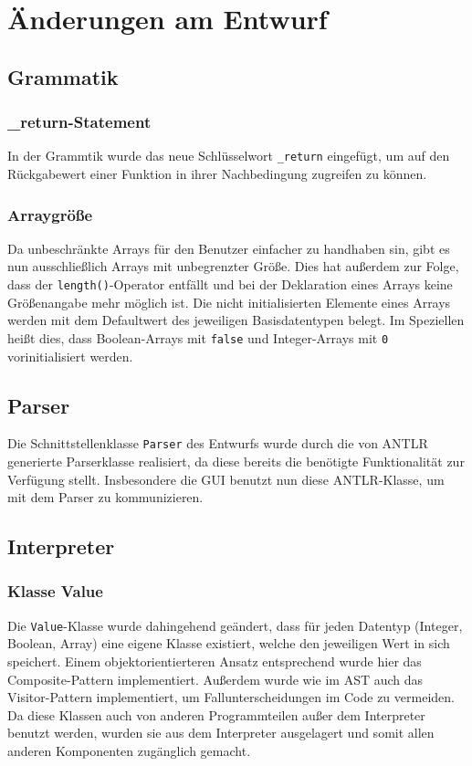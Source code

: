 \section{Änderungen am Entwurf}
\subsection{Grammatik}
\subsubsection{\_return-Statement}
In der Grammtik wurde das neue Schlüsselwort \texttt{\_return} eingefügt, um auf den Rückgabewert einer Funktion in ihrer Nachbedingung zugreifen zu können.
\subsubsection{Arraygröße}
Da unbeschränkte Arrays für den Benutzer einfacher zu handhaben sin, gibt es nun ausschließlich Arrays mit unbegrenzter Größe. Dies hat außerdem zur Folge, dass der \texttt{length()}-Operator entfällt und bei der Deklaration eines Arrays keine Größenangabe mehr möglich ist. Die nicht initialisierten Elemente eines Arrays werden mit dem Defaultwert des jeweiligen Basisdatentypen belegt. Im Speziellen heißt dies, dass Boolean-Arrays mit \texttt{false} und Integer-Arrays mit \texttt{0} vorinitialisiert werden.

\subsection{Parser\label{aenderung_parser}}
Die Schnittstellenklasse \texttt{Parser} des Entwurfs wurde durch die von ANTLR generierte Parserklasse realisiert, da diese bereits die benötigte Funktionalität zur Verfügung stellt. Insbesondere die GUI benutzt nun diese ANTLR-Klasse, um mit dem Parser zu kommunizieren.

\subsection{Interpreter}
\subsubsection{Klasse Value}
Die \texttt{Value}-Klasse wurde dahingehend geändert, dass für jeden Datentyp (Integer, Boolean, Array) eine eigene Klasse existiert, welche den jeweiligen Wert in sich speichert. Einem objektorientierteren Ansatz entsprechend wurde hier das Composite-Pattern implementiert. Außerdem wurde wie im AST auch das Visitor-Pattern implementiert, um Fallunterscheidungen im Code zu vermeiden. Da diese Klassen auch von anderen Programmteilen außer dem Interpreter benutzt werden, wurden sie aus dem Interpreter ausgelagert und somit allen anderen Komponenten zugänglich gemacht.

